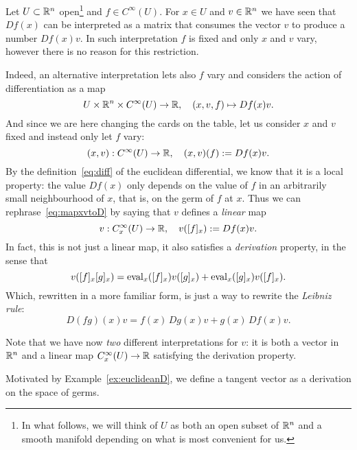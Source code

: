 \begin{example}\label{ex:euclideanD}
  Let $U\subset\mathbb{R}^n$ open\footnote{In what follows, we will think of $U$ as both an open subset of $\mathbb{R}^n$ and a smooth manifold depending on what is most convenient for us.} and $f\in C^\infty(U)$.
  For $x\in U$ and $v\in\mathbb{R}^n$ we have seen that $Df(x)$ can be interpreted as a matrix that consumes the vector $v$ to produce a number $Df(x)v$.
  In such interpretation $f$ is fixed and only $x$ and $v$ vary, however there is no reason for this restriction.

  Indeed, an alternative interpretation lets also $f$ vary and considers the action of differentiation as a map
  \begin{equation}
    U \times \mathbb{R}^n \times C^\infty(U) \to \mathbb{R},\quad
    (x,v,f) \mapsto Df(x) v.
  \end{equation}
  And since we are here changing the cards on the table, let us consider $x$ and $v$ fixed and instead only let $f$ vary:
  \begin{equation}\label{eq:mapxvtoD}
    (x,v):C^\infty(U) \to\mathbb{R}, \quad (x,v)(f) := Df(x)v.
  \end{equation}
  By the definition~\eqref{eq:diff} of the euclidean differential, we know that it is a local property: the value $Df(x)$ only depends on the value of $f$ in an arbitrarily small neighbourhood of $x$, that is, on the germ of $f$ at $x$.
  Thus we can rephrase~\eqref{eq:mapxvtoD} by saying that $v$ defines a \emph{linear} map
  \begin{equation}
    v : C_x^\infty(U) \to \mathbb{R}, \quad
    v([f]_x) := Df(x) v.
  \end{equation}
  In fact, this is not just a linear map, it also satisfies a \emph{derivation} property, in the sense that
  \begin{equation}
    v([f]_x [g]_x) =
    \operatorname{eval}_x([f]_x)v([g]_x)
    + \operatorname{eval}_x([g]_x)v([f]_x).
  \end{equation}
  Which, rewritten in a more familiar form, is just a way to rewrite the \emph{Leibniz rule}:
  \begin{equation}
    D(fg)(x) v = f(x)\,Dg(x)v + g(x)\,Df(x)v.
  \end{equation}

  Note that we have now \emph{two} different interpretations for $v$: it is both a vector in $\mathbb{R}^n$ and a linear map $C_x^\infty(U) \to \mathbb{R}$ satisfying the derivation property.
\end{example}

Motivated by Example~\ref{ex:euclideanD}, we define a tangent vector as a derivation on the space of germs.

